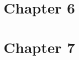 \documentclass{wileySix}
\begin{document}
\chapter{Chapter 6}


\chapter{Chapter 7}


 



\printindex


\end{document}
